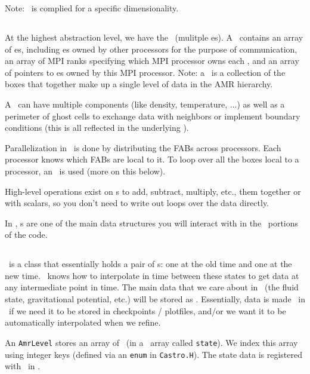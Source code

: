 Note: \castro\ is complied for a specific dimensionality.


\subsection{\multifab}

At the highest abstraction level, we have the \multifab\ (mulitple
\farraybox es).  A \multifab\ contains an array of \bbox es, including
\bbox es owned by other processors for the purpose of communication,
an array of MPI ranks specifying which MPI processor owns each \bbox,
and an array of pointers to \farraybox es owned by this MPI
processor.   Note: a
\multifab\ is a collection of the boxes that together make up a single
level of data in the AMR hierarchy.

A \multifab\ can have multiple components (like density, temperature,
...) as well as a perimeter of ghost cells to exchange data with
neighbors or implement boundary conditions (this is all reflected in
the underlying \farraybox).

Parallelization in \boxlib\ is done by distributing the FABs across
processors.  Each processor knows which FABs are local to it.  To loop
over all the boxes local to a processor, an \mfiter\ is used (more
on this below).

High-level operations exist on \multifab s to add, subtract, multiply,
etc., them together or with scalars, so you don't need to write out
loops over the data directly.

In \castro, \multifab s are one of the main data structures you will
interact with in the \cpp\ portions of the code.


\subsection{\statedata}

\statedata\ is a class that essentially holds a pair of \multifab s: one
at the old time and one at the new time.  \boxlib\ knows how to
interpolate in time between these states to get data at any
intermediate point in time.  The main data that we care about in
\castro\ (the fluid state, gravitational potential, etc.) will be
stored as \statedata.  Essentially, data is made \statedata\ in
\castro\ if we need it to be stored in checkpoints / plotfiles, and/or
we want it to be automatically interpolated when we refine.

An {\tt AmrLevel} stores an array of \statedata\ (in a \cpp\ array
called {\tt state}).  We index this array using integer keys (defined
via an {\tt enum} in {\tt Castro.H}).  The state data is registered
with \boxlib\ in .

